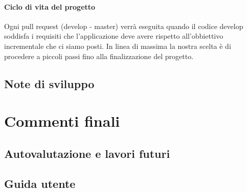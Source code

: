 \documentclass[a4paper,12pt]{report}
\begin{document}
\subsubsection{Ciclo di vita del progetto}
Ogni pull request (develop - master) verrà eseguita quando il codice develop soddisfa i requisiti che l'applicazione deve avere rispetto
all'obbiettivo incrementale che ci siamo posti.
In linea di massima la nostra scelta è di procedere a piccoli passi fino alla finalizzazione del progetto.
\section{Note di sviluppo}
\chapter{Commenti finali}
\section{Autovalutazione e lavori futuri}

\appendix
\section{Guida utente}
\end{document}
